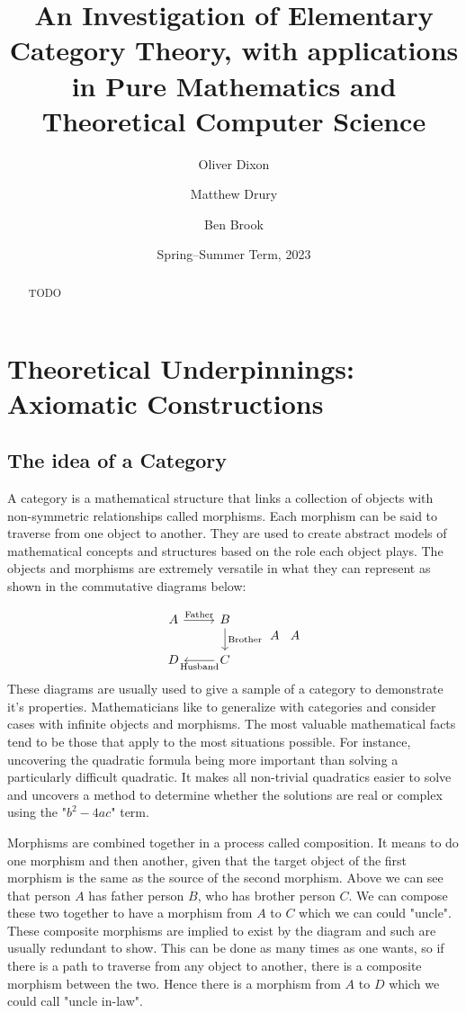 \documentclass[10pt,a4paper]{amsart}
\title[An Investigation of Elementary Category Theory]{An Investigation of %
        Elementary Category Theory, with applications in Pure Mathematics and %
        Theoretical Computer Science}
\author{Oliver Dixon}  \email{\yorkemail{od641}}
\author{Matthew Drury} \email{\yorkemail{md1499}}
\author{Ben Brook}     \email{\yorkemail{bb1170}}
\date{Spring--Summer Term, 2023}
\begin{document}
\begin{abstract}
        TODO
\end{abstract}
\maketitle
\tableofcontents
\section{Theoretical %
        Underpinnings: Axiomatic Constructions}
\subsection{The idea of a Category}
\begin{flushleft}
A category is a mathematical structure that links a collection of objects with non-symmetric relationships called morphisms.
Each morphism can be said to traverse from one object to another.
They are used to create abstract models of mathematical concepts and structures based on the role each object plays.
The objects and morphisms are extremely versatile in what they can represent as shown in the commutative diagrams below:

\begin{equation}
\begin{tikzcd} 
        A \ar[r,"\text{Father}"] & B \ar[d,"\text{Brother}"]\\
        D & C \ar[l,"\text{Husband}"]
\end{tikzcd}
%
\begin{tikzcd}
A
\end{tikzcd}
%
\begin{tikzcd}
A
\end{tikzcd}
\end{equation}
These diagrams are usually used to give a sample of a category to demonstrate it's properties.
Mathematicians like to generalize with categories and consider cases with infinite objects and morphisms.
The most valuable mathematical facts tend to be those that apply to the most situations possible.
For instance, uncovering the quadratic formula being more important than solving a particularly difficult quadratic.
It makes all non-trivial quadratics easier to solve and uncovers a method to determine whether the solutions are real or complex using the "$b^2-4ac$" term.

Morphisms are combined together in a process called composition.
It means to do one morphism and then another, given that the target object of the first morphism is the same as the source of the second morphism.
Above we can see that person $A$ has father person $B$, who has brother person $C$.
We can compose these two together to have a morphism from $A$ to $C$ which we can could "uncle".
These composite morphisms are implied to exist by the diagram and such are usually redundant to show.
This can be done as many times as one wants, so if there is a path to traverse from any object to another, there is a composite morphism between the two.
Hence there is a morphism from $A$ to $D$ which we could call "uncle in-law".


\end{flushleft}
\end{document}

